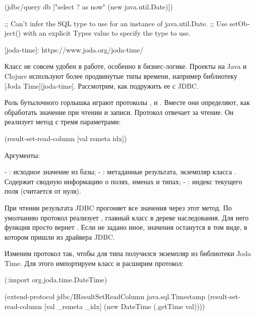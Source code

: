 \begin{english}
  \begin{clojure}
(jdbc/query db ["select ? as now" (new java.util.Date)])

;; Can't infer the SQL type to use for an instance of java.util.Date.
;; Use setObject() with an explicit Types value to specify the type to use.
  \end{clojure}
\end{english}

[joda-time]: https://www.joda.org/joda-time/

Класс  не совсем удобен в работе, особенно в бизнес-логике. Проекты на Java и Clojure используют более продвинутые типы времени, например библиотеку [Joda Time][joda-time]. Рассмотрим, как подружить ее с JDBC.

Роль бутылочного горлышка играют протоколы ,  и . Вместе они определяют, как обработать значение при чтении и записи. Протокол  отвечает за чтение. Он реализует метод с тремя параметрами:

\begin{english}
  \begin{clojure}
(result-set-read-column [val rsmeta idx])
  \end{clojure}
\end{english}

Аргументы:

- : исходное значение из базы;
- : метаданные результата, экземпляр класса . Содержит сводную информацию о полях, именах и типах;
- : индекс текущего поля (считается от нуля).

При чтении результата JDBC прогоняет все значения через этот метод. По умолчанию протокол реализует , главный класс в дереве наследования. Для него функция  просто вернет . Если не задано иное, значения останутся в том виде, в котором пришли из драйвера JDBC.

Изменим протокол так, чтобы для типа  получился экземпляр  из библиотеки Joda Time. Для этого импортируем класс и расширим протокол:

\begin{english}
  \begin{clojure}
(:import org.joda.time.DateTime)

(extend-protocol jdbc/IResultSetReadColumn
  java.sql.Timestamp
  (result-set-read-column [val _rsmeta _idx]
    (new DateTime (.getTime val))))
  \end{clojure}
\end{english}

